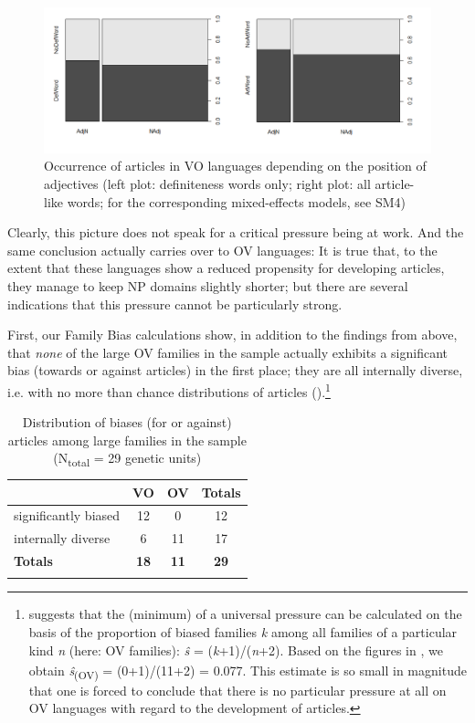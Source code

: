 \documentclass[output=paper]{langsci/langscibook}
\begin{document}
  

\begin{figure}
\includegraphics[width=\textwidth]{figures/schmidtkebode-img4.png}
\caption{Occurrence of articles in VO languages depending on the position of adjectives (left plot: definiteness words only; right plot: all article-like words; for the corresponding mixed-effects models, see SM4)}
\label{fig:ksb:4}
\end{figure}

Clearly, this picture does not speak for a critical  pressure being at work. And the same conclusion actually carries over to OV languages: It is true that, to the extent that these languages show a reduced propensity for developing articles, they manage to keep NP  domains slightly shorter; but there are several indications that this pressure cannot be particularly strong. 

First, our Family Bias calculations show, in addition to the findings from above, that \textit{none} of the large OV families in the sample actually exhibits a significant bias (towards or against articles) in the first place; they are all internally diverse, i.e. with no more than chance distributions of articles ().\footnote{\citet{Bickel2013_Fam} suggests that the (minimum)  of a universal pressure can be calculated on the basis of the proportion of biased families \textit{k} among all families of a particular kind \textit{n} (here: OV families): \textit{\^s}\textsubscript{} =\textsubscript{} (\textit{k}+1)/(\textit{n}+2). Based on the figures in , we obtain \textit{\^s}\textsubscript{(OV)} = (0+1)/(11+2) = 0.077. This estimate is so small in magnitude that one is forced to conclude that there is no particular pressure at all on OV languages with regard to the development of articles.} 

\begin{table}
\begin{tabularx}{.8\textwidth}{lSSS}
\lsptoprule
& VO & OV &  Totals\\
\midrule
significantly biased & 12 & 0 & 12\\
internally diverse & 6 & 11 & 17\\
\midrule
\textbf{Totals} & \textbf{18} & \textbf{11} & \textbf{29}\\
\lspbottomrule
\end{tabularx}
\caption{Distribution of biases (for or against) articles among large families in the sample (N\textsubscript{total} = 29 genetic units)}
\label{tab:ksb:4}
\end{table}
\end{document}
